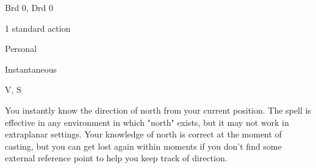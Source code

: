 
\begin{description*}
\item[Level:] Brd 0, Drd 0
\item[Casting Time:] 1 standard action
\item[Range:] Personal
\item[Duration:] Instantaneous
\item[Components:] V, S
\end{description*}

You instantly know the direction of north from your current position. The spell
is effective in any environment in which "north" exists, but it may not work
in extraplanar settings. Your knowledge of north is correct at the moment of casting,
but you can get lost again within moments if you don't find some external reference
point to help you keep track of direction.